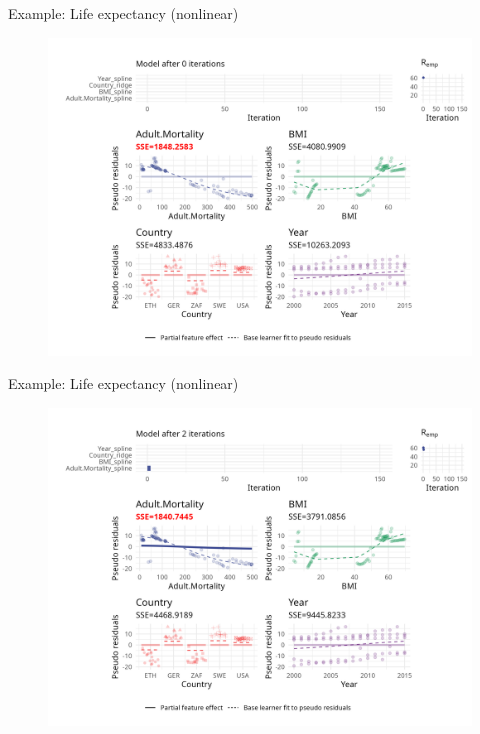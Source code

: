 
\begin{frame}{Example: Life expectancy (nonlinear)}
	\begin{figure}
		\centering
		\includegraphics[width=\textwidth]{figures/cwb-anim/fig-iter-0001.png}
	\end{figure}
	\addtocounter{framenumber}{0}
\end{frame}


\begin{frame}{Example: Life expectancy (nonlinear)}
	\begin{figure}
		\centering
		\includegraphics[width=\textwidth]{figures/cwb-anim/fig-iter-0002.png}
	\end{figure}
	\addtocounter{framenumber}{-1}
\end{frame}



